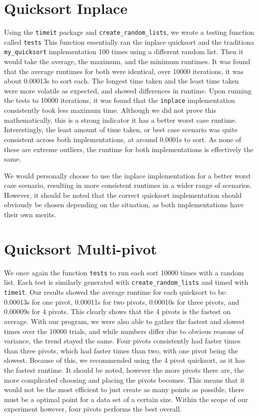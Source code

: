 \documentclass{article}
\begin{document}
\section*{Quicksort Inplace}
Using the \verb|timeit| package and \verb|create_random_lists|, we wrote a testing function called \verb|tests| This function essentially ran the inplace quicksort and the traditiona \verb|my_quicksort| implementation 100 times using a different random list. Then it would take the average, the maximum, and the minimum runtimes. It was found that the average runtimes for both were identical, over 10000 iterations, it was about 0.00013s to sort each.
\break \break
The longest time taken and the least time taken were more volatile as expected, and showed differences in runtime. Upon running the tests to 10000 iterations, it was found that the \verb|inplace| implementation consistently took less maximum time. Although we did not prove this mathematically, this is a strong indicator it has a better worst case runtime. Interestingly, the least amount of time taken, or best case scenario was quite consistent across both implementations, at around 0.0001s to sort. As none of these are extreme outliers, the runtime for both implementations is effectively the same.

\break\break
We would personally choose to use the inplace implementation for a better worst case scenario, resulting in more consistent runtimes in a wider range of scenarios. However, it should be noted that the correct quicksort implementation should obviously be chosen depending on the situation, as both implementations have their own merits.

\section*{Quicksort Multi-pivot}
We once again the function \verb|tests| to run each sort 10000 times with a random list. Each test is similarly generated with \verb|create_random_lists| and timed with \verb|timeit|. Our results showed the average runtime for each quicksort  to be: 0.00013s for one pivot, 0.00011s for two pivots, 0.00010s for three pivots, and 0.00009s for 4 pivots. This clearly shows that the 4 pivots is the fastest on average. With our program, we were also able to gather the fastest and slowest times over the 10000 trials, and while numbers differ due to obvious reasons of variance, the trend stayed the same. Four pivots consistently had faster times than three pivots, which had faster times than two, with one pivot being the slowest. Because of this, we recommended using the 4 pivot quicksort, as it has the fastest runtime. It should be noted, however the more pivots there are, the more complicated choosing and placing the pivots becomes. This means that it would not be the most efficient to just create as many points as possible, there must be a optimal point for a data set of a certain size. Within the scope of our experiment however, four pivots performs the best overall.
\end{document}
